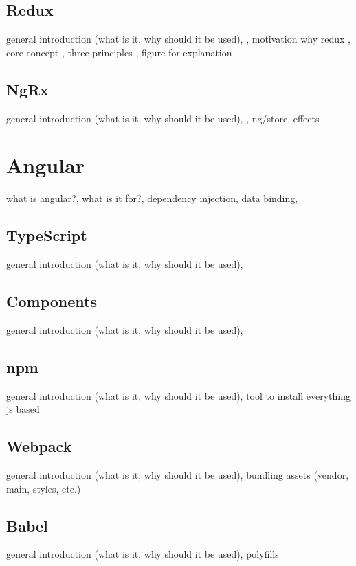\documentclass[Bachelor,BIF,english]{twbook}
\begin{document}
\subsection{Redux}
general introduction (what is it, why should it be used), \cite{Redux}, motivation why redux \cite{ReduxIntroMoti}, core concept \cite{ReduxIntroCC}, three principles \cite{ReduxIntro3P}, figure for explanation

\subsection{NgRx}
general introduction (what is it, why should it be used), \cite{Ngrx}, ng/store, effects


\section{Angular}
what is angular?, what is it for?, dependency injection, data binding, \cite[p.~]{YakovFainAngular}

\subsection{TypeScript}
general introduction (what is it, why should it be used), 

\subsection{Components}
general introduction (what is it, why should it be used), 

\subsection{npm}
general introduction (what is it, why should it be used), 
tool to install everything js based

\subsection{Webpack}
general introduction (what is it, why should it be used), 
bundling assets (vendor, main, styles, etc.)

\subsection{Babel}
general introduction (what is it, why should it be used), 
polyfills

\clearpage 
\end{document}
